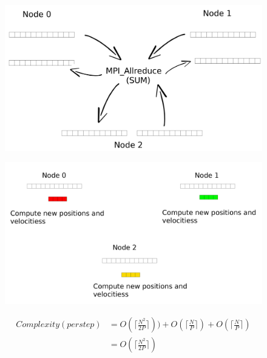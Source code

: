 \documentclass[a4paper]{article}
\begin{document}
\begin{figure}
\centering
\begin{minipage}{.45\textwidth}
  \centering
  \includegraphics[width=1\linewidth]{MPI_all_reduce}
  \label{fig:D1}
\end{minipage}%
\begin{minipage}{.45\textwidth}
  \centering
  \includegraphics[width=1\linewidth]{compute_positions_only}
  \label{fig:E1}
\end{minipage}
\end{figure}
\FloatBarrier

\begin{equation} \label{eq:comp_app2}
\begin{split}
Complexity (per step) & = O(\lceil\frac{N^2}{2P}\rceil)) + O(\lceil\frac{N}{P}\rceil) + O(\lceil\frac{N}{P}\rceil)\\
 & = O(\lceil\frac{N^2}{2P}\rceil)
\end{split}
\end{equation}
\end{document}
